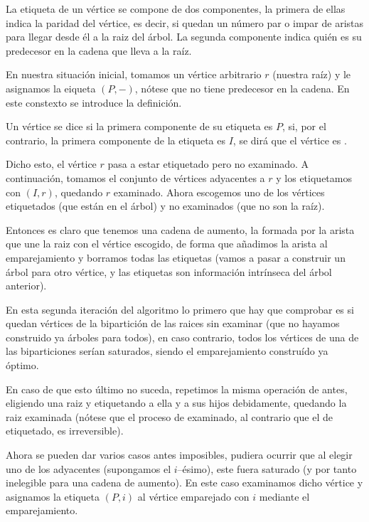 La etiqueta de un vértice se compone de dos componentes, la primera de ellas indica la paridad del vértice, es decir, si quedan un número par o impar de aristas para llegar desde él a la raiz del árbol. La segunda componente indica quién es su predecesor en la cadena que lleva a la raíz.

En nuestra situación inicial, tomamos un vértice arbitrario $r$ (nuestra raíz) y le asignamos la eiqueta $(P,-)$, nótese que no tiene predecesor en la cadena. En este constexto se introduce la definición.
\begin{defi}[Paridad]
	Un vértice se dice  si la primera componente de su etiqueta es $P$, si, por el contrario, la primera componente de la etiqueta es $I$, se dirá que el vértice es .
\end{defi}
Dicho esto, el vértice $r$ pasa a estar etiquetado pero no examinado. A continuación, tomamos el conjunto de vértices adyacentes a $r$ y los etiquetamos con $(I,r)$, quedando $r$ examinado. Ahora escogemos uno de los vértices etiquetados (que están en el árbol) y no examinados (que no son la raíz). 

Entonces es claro que tenemos una cadena de aumento, la formada por la arista que une la raiz con el vértice escogido, de forma que añadimos la arista al emparejamiento y borramos todas las etiquetas (vamos a pasar a construir un árbol para otro vértice, y las etiquetas son información intrínseca del árbol anterior).

En esta segunda iteración del algoritmo lo primero que hay que comprobar es si quedan vértices de la bipartición de las raices sin examinar (que no hayamos construido ya árboles para todos), en caso contrario, todos los vértices de una de las biparticiones serían saturados, siendo el emparejamiento construído ya óptimo.

En caso de que esto último no suceda, repetimos la misma operación de antes, eligiendo una raiz y etiquetando a ella y a sus hijos debidamente, quedando la raiz examinada (nótese que el proceso de examinado, al contrario que el de etiquetado, es irreversible).

Ahora se pueden dar varios casos antes imposibles, pudiera ocurrir que al elegir uno de los adyacentes (supongamos el $i$--ésimo), este fuera saturado (y por tanto inelegible para una cadena de aumento). En este caso examinamos dicho vértice y asignamos la etiqueta $(P,i)$ al vértice emparejado con $i$ mediante el emparejamiento.

